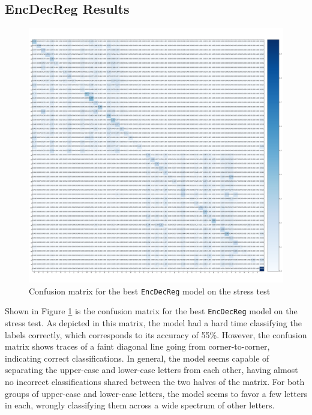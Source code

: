 \newpage
\subsection{EncDecReg Results}
\begin{figure}[ht]
    \centering
    \includegraphics[width=1\textwidth]{fig/results/experiment4/encdecreg/confusion_matrix.png}
    \caption{Confusion matrix for the best {\tt EncDecReg} model on the stress test}
    \label{fig:result4_encdecreg_confusion_matrix}
\end{figure}

Shown in Figure \ref{fig:result4_encdecreg_confusion_matrix} is the confusion matrix for the best {\tt EncDecReg} model on the stress test. As depicted in this matrix, the model had a hard time classifying the labels correctly, which corresponds to its accuracy of 55\%. However, the confusion matrix shows traces of a faint diagonal line going from corner-to-corner, indicating correct classifications. In general, the model seems capable of separating the upper-case and lower-case letters from each other, having almost no incorrect classifications shared between the two halves of the matrix. For both groups of upper-case and lower-case letters, the model seems to favor a few letters in each, wrongly classifying them across a wide spectrum of other letters.

